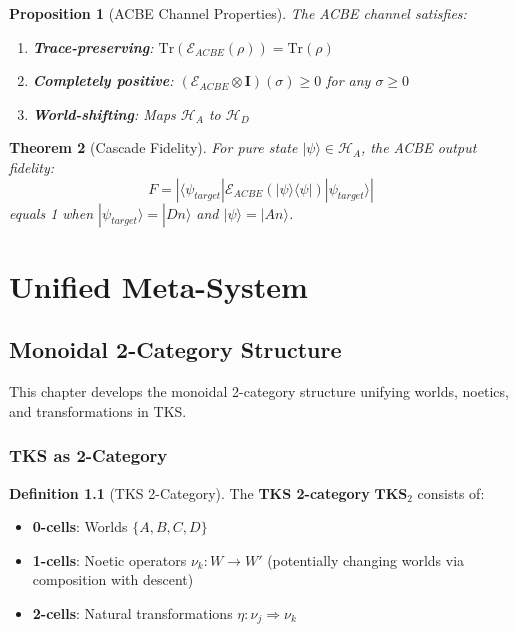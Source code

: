 \documentclass[11pt,twoside,openright]{book}
\theoremstyle{definition}
\newtheorem{definition}{Definition}[chapter]
\theoremstyle{plain}
\newtheorem{theorem}[definition]{Theorem}
\newtheorem{proposition}[definition]{Proposition}
\theoremstyle{remark}
\newcommand{\noe}[1]{\nu_{#1}}
\newcommand{\Hspace}{\mathcal{H}}
\newcommand{\qket}[1]{|#1\rangle}
\newcommand{\qbra}[1]{\langle #1|}
\newcommand{\Trace}{\mathrm{Tr}}             %
\newcommand{\vnewtwo}{\textbf{v7.2 New}}
\begin{document}
\begin{proposition}[ACBE Channel Properties]
\label{prop:acbe-channel}
The ACBE channel satisfies:
\begin{enumerate}
  \item \textbf{Trace-preserving}: $\Trace(\mathcal{E}_{ACBE}(\rho)) = \Trace(\rho)$
  \item \textbf{Completely positive}: $(\mathcal{E}_{ACBE} \otimes \mathbf{I})(\sigma) \geq 0$ for any $\sigma \geq 0$
  \item \textbf{World-shifting}: Maps $\Hspace_A$ to $\Hspace_D$
\end{enumerate}
\end{proposition}

\begin{theorem}[Cascade Fidelity]
\label{thm:cascade-fidelity}
For pure state $\qket{\psi} \in \Hspace_A$, the ACBE output fidelity:
\[
F = |\qbra{\psi_{target}}\mathcal{E}_{ACBE}(\qket{\psi}\qbra{\psi})\qket{\psi_{target}}|
\]
equals 1 when $\qket{\psi_{target}} = \qket{Dn}$ and $\qket{\psi} = \qket{An}$.
\end{theorem}

\part{Unified Meta-System}

\chapter{Monoidal 2-Category Structure}
\label{ch:monoidal-2cat}

\begin{tcolorbox}[colback=blue!5!white,colframe=blue!75!black,title=\vnewtwo]
This chapter develops the monoidal 2-category structure unifying worlds, noetics, and transformations in TKS.
\end{tcolorbox}

\section{TKS as 2-Category}

\begin{definition}[TKS 2-Category]
\label{def:tks-2cat}
The \textbf{TKS 2-category} $\mathbf{TKS}_2$ consists of:
\begin{itemize}
  \item \textbf{0-cells}: Worlds $\{A, B, C, D\}$
  \item \textbf{1-cells}: Noetic operators $\noe{k} : W \to W'$ (potentially changing worlds via composition with descent)
  \item \textbf{2-cells}: Natural transformations $\eta : \noe{j} \Rightarrow \noe{k}$
\end{itemize}
\end{definition}
\end{document}
